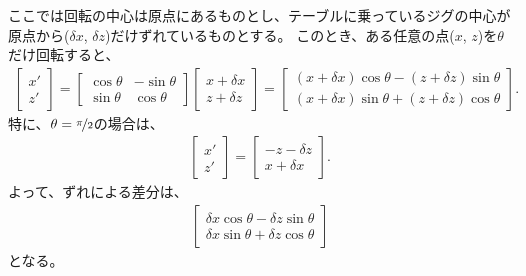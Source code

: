 ここでは回転の中心は原点にあるものとし、テーブルに乗っているジグの中心が原点から($\delta x$, $\delta z$)だけずれているものとする。
このとき、ある任意の点($x$, $z$)を$\theta$だけ回転すると、
\begin{align*}
  \left[
    \begin{array}{c}
      x'\\
      z'
    \end{array}
  \right]
  = \left[
    \begin{array}{cc}
      \cos\theta & -\sin\theta\\
      \sin\theta & \cos\theta
    \end{array}
  \right]\!\!
  \left[
    \begin{array}{c}
      x+\delta x\\
      z+\delta z
    \end{array}
  \right]
  = \left[
    \begin{array}{c}
      (x+\delta x)\cos\theta-(z+\delta z)\sin\theta\\
      (x+\delta x)\sin\theta+(z+\delta z)\cos\theta
    \end{array}
  \right].
\end{align*}
特に、$\theta = \nicefrac\pi2$の場合は、
\begin{align*}
  \left[
    \begin{array}{c}
      x'\\
      z'
    \end{array}
  \right]
  = \left[
    \begin{array}{c}
      -z-\delta z\\
      x+\delta x
    \end{array}
  \right].
\end{align*}
よって、ずれによる差分は、
\begin{align*}
  \left[
    \begin{array}{c}
      \delta x\cos\theta-\delta z\sin\theta\\
      \delta x\sin\theta+\delta z\cos\theta
    \end{array}
  \right]
\end{align*}
となる。




